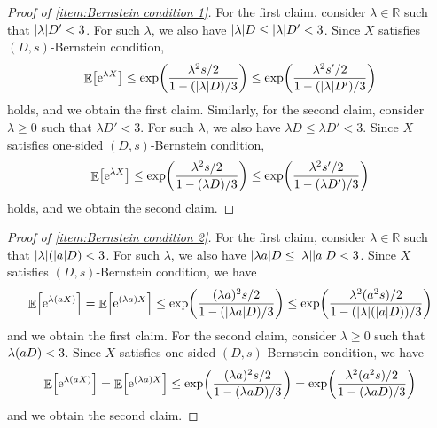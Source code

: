 \documentclass[letterpaper,11pt]{article}
\DeclarePairedDelimiter{\rbra}{\lparen}{\rparen} %
\DeclarePairedDelimiter{\sbra}{\lbrack}{\rbrack} %
\DeclareMathOperator*{\E}{\mathbb{E}}
\newcommand{\e}{\mathrm{e}}
\newcommand{\bounded}{D}
\newcommand{\variance}{s}
\begin{document}
    \begin{proof}[Proof of \cref{item:Bernstein condition 1}]
    For the first claim, consider $\lambda\in \mathbb{R}$ such that $\abs{\lambda} \bounded'<3$.
    For such $\lambda$, we also have $\abs{\lambda} \bounded \leq \abs{\lambda} \bounded'<3$.
    Since $X$ satisfies $(\bounded,\variance)$-Bernstein condition, 
        \begin{align*}
            \E\sbra*{\e^{\lambda X}}
            \leq \exp\rbra*{\frac{\lambda^2\variance/2}{1-(\abs{\lambda}\bounded )/3}}
            \leq \exp\rbra*{\frac{\lambda^2\variance'/2}{1-(\abs{\lambda}\bounded' )/3}}
        \end{align*}
        holds, and we obtain the first claim.
        Similarly, for the second claim, consider $\lambda \geq 0$ such that $\lambda \bounded'<3$.
        For such $\lambda$, we also have $\lambda \bounded \leq \lambda \bounded'<3$.
        Since $X$ satisfies one-sided $(\bounded,\variance)$-Bernstein condition,
        \begin{align*}
            \E\sbra*{\e^{\lambda X}}
            \leq \exp\rbra*{\frac{\lambda^2\variance/2}{1-(\lambda\bounded )/3}}
            \leq \exp\rbra*{\frac{\lambda^2\variance'/2}{1-(\lambda\bounded' )/3}}
        \end{align*}
        holds, and we obtain the second claim.
    \end{proof}
    \begin{proof}[Proof of \cref{item:Bernstein condition 2}]
    For the first claim, consider $\lambda\in \mathbb{R}$ such that $\abs{\lambda} \qty(\abs{a} \bounded)<3$.
    For such $\lambda$, we also have $\abs{\lambda a} \bounded \leq \abs{\lambda} \abs{a} \bounded<3$.
    Since $X$ satisfies $(\bounded,\variance)$-Bernstein condition, we have
        \begin{align*}
            \E\sbra*{\e^{\lambda (aX)}}
            =\E\sbra*{\e^{(\lambda a)X}}
            \leq \exp\rbra*{\frac{(\lambda a)^2\variance/2}{1-(\abs{\lambda a}\bounded )/3}}
            \leq \exp\rbra*{\frac{\lambda^2 (a^2\variance)/2}{1-(\abs{\lambda} (\abs{a}\bounded) )/3}}
        \end{align*}
    and we obtain the first claim.
%
    For the second claim, consider $\lambda\geq 0$ such that $\lambda \qty(a \bounded)<3$.
    Since $X$ satisfies one-sided $(\bounded,\variance)$-Bernstein condition, we have
        \begin{align*}
            \E\sbra*{\e^{\lambda (aX)}}
            =\E\sbra*{\e^{(\lambda a)X}}
            \leq \exp\rbra*{\frac{(\lambda a)^2\variance/2}{1-(\lambda a\bounded )/3}}
            = \exp\rbra*{\frac{\lambda^2 (a^2\variance)/2}{1-(\lambda a \bounded )/3}}
        \end{align*}
    and we obtain the second claim.
    \end{proof}
\end{document}
